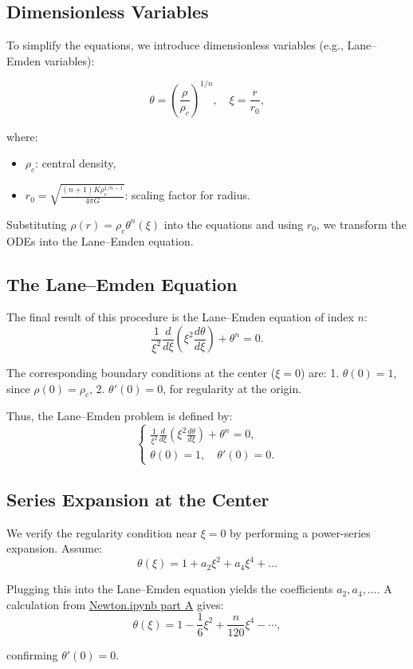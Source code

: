 \documentclass{article}
\begin{document}
\subsection{Dimensionless Variables}

To simplify the equations, we introduce dimensionless variables (e.g., Lane–Emden variables):

\[
\theta = \left(\frac{\rho}{\rho_c}\right)^{1/n}, \quad \xi = \frac{r}{r_0},
\]

where:
\begin{itemize}
    \item \(\rho_c\): central density,
    \item \(r_0 = \sqrt{\frac{(n+1)K\rho_c^{1/n - 1}}{4\pi G}}\): scaling factor for radius.
\end{itemize}

Substituting \(\rho(r) = \rho_c \theta^n(\xi)\) into the equations and using \(r_0\), we transform the ODEs into the Lane–Emden equation.

\subsection{The Lane–Emden Equation}

The final result of this procedure is the Lane–Emden equation of index \(n\):
\[
\boxed{
\frac{1}{\xi^2} \frac{d}{d\xi} \left( \xi^2 \frac{d\theta}{d\xi} \right) + \theta^n = 0.
}
\]

The corresponding boundary conditions at the center (\(\xi=0\)) are:
1. \(\theta(0) = 1\), since \(\rho(0) = \rho_c\),
2. \(\theta'(0) = 0\), for regularity at the origin.

Thus, the Lane–Emden problem is defined by:
\[
\begin{cases}
\frac{1}{\xi^2} \frac{d}{d\xi} \left( \xi^2 \frac{d\theta}{d\xi} \right) + \theta^n = 0, \\[6pt]
\theta(0) = 1, \quad \theta'(0) = 0.
\end{cases}
\]

\subsection{Series Expansion at the Center}

We verify the regularity condition near \(\xi=0\) by performing a power-series expansion. Assume:
\[
\theta(\xi) 
= 1 + a_2 \xi^2 + a_4 \xi^4 + \dots
\]

Plugging this into the Lane–Emden equation yields the coefficients \(a_2, a_4, \dots\). A calculation from \href{Newton.ipynb}{Newton.ipynb part A} gives:
\[
\theta(\xi)
= 1 - \frac{1}{6}\xi^2 + \frac{n}{120}\xi^4 - \cdots,
\]

confirming \(\theta'(0) = 0\).
\end{document}
